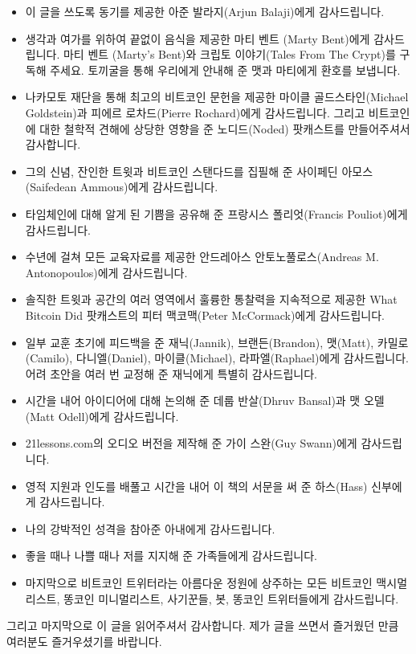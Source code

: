 \begin{itemize}
\begin{comment}
		\item Thanks to my wife for putting up with me and my obsessive nature.
		\item Thanks to my family for supporting me during both the good times and the bad.
		\item Last but not least, thanks to all the bitcoin maximalists, shitcoin minimalists, shills, bots, and shitposters which reside in the beautiful garden that is Bitcoin twitter.
	\end{comment}
	\item 이 글을 쓰도록 동기를 제공한 아준 발라지(Arjun Balaji)에게 감사드립니다.
	\item 생각과 여가를 위하여 끝없이 음식을 제공한 마티 벤트 (Marty Bent)에게 감사드립니다. 마티 벤트 (Marty’s Bent)와 크립토 이야기(Tales From The Crypt)를 구독해 주세요. 토끼굴을 통해 우리에게 안내해 준 맷과 마티에게 환호를 보냅니다.
	\item 나카모토 재단을 통해 최고의 비트코인 문헌을 제공한 마이클 골드스타인(Michael Goldstein)과 피에르 로차드(Pierre Rochard)에게 감사드립니다. 그리고 비트코인에 대한 철학적 견해에 상당한 영향을 준 노디드(Noded) 팟캐스트를 만들어주셔서 감사합니다.
	\item 그의 신념, 잔인한 트윗과 비트코인 스탠다드를 집필해 준 사이페딘 아모스(Saifedean Ammous)에게 감사드립니다.
	\item 타임체인에 대해 알게 된 기쁨을 공유해 준 프랑시스 폴리엇(Francis Pouliot)에게 감사드립니다.
	\item 수년에 걸쳐 모든 교육자료를 제공한 안드레아스 안토노풀로스(Andreas M. Antonopoulos)에게 감사드립니다.
	\item 솔직한 트윗과 공간의 여러 영역에서 훌륭한 통찰력을 지속적으로 제공한 What Bitcoin Did 팟캐스트의 피터 맥코맥(Peter McCormack)에게 감사드립니다.
	\item 일부 교훈 초기에 피드백을 준 재닉(Jannik), 브랜든(Brandon), 맷(Matt), 카밀로(Camilo), 다니엘(Daniel), 마이클(Michael), 라파엘(Raphael)에게 감사드립니다. 어려 초안을 여러 번 교정해 준 재닉에게 특별히 감사드립니다.
	\item 시간을 내어 아이디어에 대해 논의해 준 데룹 반살(Dhruv Bansal)과 맷 오델(Matt Odell)에게 감사드립니다.
	\item 21lessons.com의 오디오 버전을 제작해 준 가이 스완(Guy Swann)에게 감사드립니다.
	\item 영적 지원과 인도를 배풀고 시간을 내어 이 책의 서문을 써 준 하스(Hass) 신부에게 감사드립니다.
	\item 나의 강박적인 성격을 참아준 아내에게 감사드립니다.
	\item 좋을 때나 나쁠 때나 저를 지지해 준 가족들에게 감사드립니다.
	\item 마지막으로 비트코인 트위터라는 아름다운 정원에 상주하는 모든 비트코인 맥시멀리스트, 똥코인 미니멀리스트, 사기꾼들, 봇, 똥코인 트위터들에게 감사드립니다.
\end{itemize}


그리고 마지막으로 이 글을 읽어주셔서 감사합니다. 
제가 글을 쓰면서 즐거웠던 만큼 여러분도 즐거우셨기를 바랍니다.
